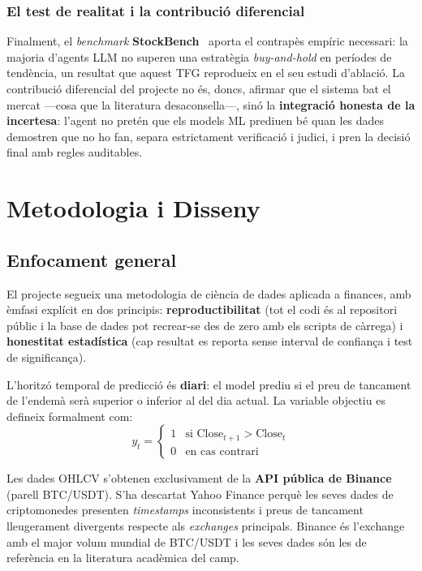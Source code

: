 \documentclass[12pt, a4paper]{report}
\begin{document}
\subsection{El test de realitat i la contribució diferencial}

Finalment, el \textit{benchmark} \textbf{StockBench}~\cite{stockbench2025} aporta el contrapès empíric necessari: la majoria d'agents LLM no superen una estratègia \textit{buy-and-hold} en períodes de tendència, un resultat que aquest TFG reprodueix en el seu estudi d'ablació. La contribució diferencial del projecte no és, doncs, afirmar que el sistema bat el mercat ---cosa que la literatura desaconsella---, sinó la \textbf{integració honesta de la incertesa}: l'agent no pretén que els models ML prediuen bé quan les dades demostren que no ho fan, separa estrictament verificació i judici, i pren la decisió final amb regles auditables.

\chapter{Metodologia i Disseny}

\section{Enfocament general}

El projecte segueix una metodologia de ciència de dades aplicada a finances, amb èmfasi explícit en dos principis: \textbf{reproductibilitat} (tot el codi és al repositori públic i la base de dades pot recrear-se des de zero amb els scripts de càrrega) i \textbf{honestitat estadística} (cap resultat es reporta sense interval de confiança i test de significança).

L'horitzó temporal de predicció és \textbf{diari}: el model prediu si el preu de tancament de l'endemà serà superior o inferior al del dia actual. La variable objectiu es defineix formalment com:
\[
  y_t = \begin{cases} 1 & \text{si } \mathrm{Close}_{t+1} > \mathrm{Close}_t \\ 0 & \text{en cas contrari} \end{cases}
\]

\begin{infobox}
Les dades OHLCV s'obtenen exclusivament de la \textbf{API pública de Binance} (parell BTC/USDT). S'ha descartat Yahoo Finance perquè les seves dades de criptomonedes presenten \textit{timestamps} inconsistents i preus de tancament lleugerament divergents respecte als \textit{exchanges} principals. Binance és l'exchange amb el major volum mundial de BTC/USDT i les seves dades són les de referència en la literatura acadèmica del camp.
\end{infobox}
\end{document}
